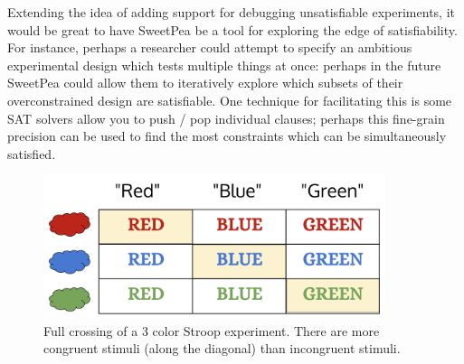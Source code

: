 Extending the idea of adding support for debugging unsatisfiable experiments, it would be great to have SweetPea be a tool for exploring the edge of satisfiability. For instance, perhaps a researcher could attempt to specify an ambitious experimental design which tests multiple things at once: perhaps in the future SweetPea could allow them to iteratively explore which subsets of their overconstrained design are satisfiable. One technique for facilitating this is some SAT solvers allow you to push / pop individual clauses; perhaps this fine-grain precision can be used to find the most constraints which can be simultaneously satisfied.

%
%
%
%


\begin{figure}
    \centerline{\includegraphics[origin=c,width=10cm]{fig_weighted_crossing}}
    \caption{Full crossing of a 3 color Stroop experiment. There are more congruent stimuli (along the diagonal) than incongruent stimuli.}%
    \label{fig:weighted_crossing}%
\end{figure}
